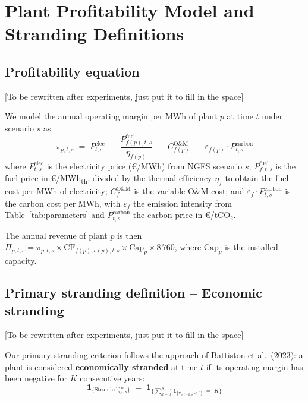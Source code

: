 \documentclass[a4paper, 12pt]{report}
\numberwithin{equation}{chapter}
\numberwithin{figure}{chapter}
\numberwithin{table}{chapter}
\newcommand{\ind}[1]{\mathbf{1}_{\{#1\}}}
\begin{document}
\chapter{Plant Profitability Model and Stranding Definitions}
\label{ch:profit}

\section{Profitability equation}

[To be rewritten after experiments, just put it to fill in the space]

We model the annual operating margin per MWh of plant $p$ at time $t$ under scenario $s$ as:
\begin{equation}
\pi_{p,t,s} \;=\; P^{\text{elec}}_{t,s} \;-\; \frac{P^{\text{fuel}}_{f(p),t,s}}{\eta_{f(p)}} \;-\; C^{\text{O\&M}}_{f(p)} \;-\; \varepsilon_{f(p)} \cdot P^{\text{carbon}}_{t,s}
\label{eq:profit}
\end{equation}
where $P^{\text{elec}}_{t,s}$ is the electricity price (\euro/MWh) from NGFS scenario $s$; $P^{\text{fuel}}_{f,t,s}$ is the fuel price in \euro/MWh\textsubscript{th}, divided by the thermal efficiency $\eta_f$ to obtain the fuel cost per MWh of electricity; $C^{\text{O\&M}}_f$ is the variable O\&M cost; and $\varepsilon_f \cdot P^{\text{carbon}}_{t,s}$ is the carbon cost per MWh, with $\varepsilon_f$ the emission intensity from Table~\ref{tab:parameters} and $P^{\text{carbon}}_{t,s}$ the carbon price in \euro/tCO$_2$.

The annual revenue of plant $p$ is then $\Pi_{p,t,s} = \pi_{p,t,s} \times \text{CF}_{f(p),c(p),t,s} \times \text{Cap}_p \times 8\,760$, where $\text{Cap}_p$ is the installed capacity.

\section{Primary stranding definition -- Economic stranding}
\label{sec:econ_strand}

[To be rewritten after experiments, just put it to fill in the space]

Our primary stranding criterion follows the approach of Battiston et al.\ (2023): a plant is considered \textbf{economically stranded} at time $t$ if its operating margin has been negative for $K$ consecutive years:
\begin{equation}
\ind{\text{Stranded}^{\text{econ}}_{p,t,s}} \;=\; \ind{\sum_{k=0}^{K-1} \ind{\pi_{p,t-k,s} < 0} \;=\; K}
\label{eq:econ_strand}
\end{equation}
\end{document}
